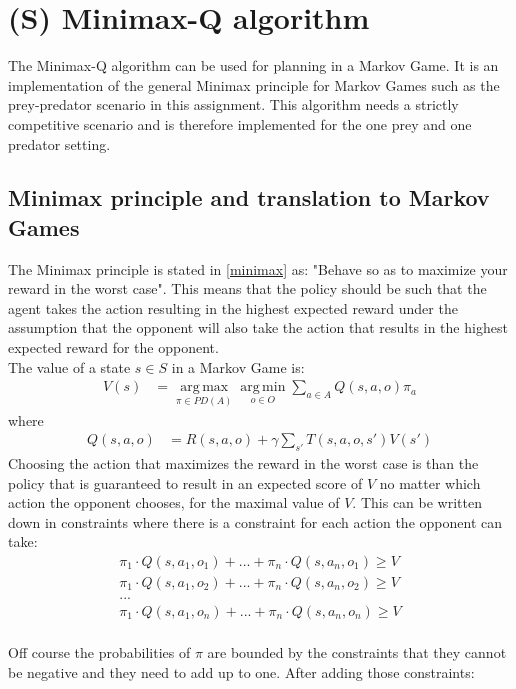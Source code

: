 
\section{(S) Minimax-Q algorithm}
The Minimax-Q algorithm can be used for planning in a Markov Game. It is an implementation of the general Minimax principle for Markov Games such as the prey-predator scenario in this assignment. This algorithm needs a strictly competitive scenario and is therefore implemented for the one prey and one predator setting. 

\subsection{Minimax principle and translation to Markov Games}
The Minimax principle is stated in \ref{minimax} as: "Behave so as to maximize your reward in the worst case". This means that the policy should be such that the agent takes the action resulting in the highest expected reward under the assumption that the opponent will also take the action that results in the highest expected reward for the opponent.  \\

 
The value of a state $s\in S$ in a Markov Game is:
\begin{align*}
V(s) &= \operatorname*{arg\,max}_{\pi \in PD(A)}
\operatorname*{arg\,min}_{o \in O}
\sum_{a \in A} Q(s,a,o) \pi_a
\end{align*}
where
\begin{align*}
Q(s,a,o) &= R(s,a,o) + \gamma \sum_{s'} T(s,a,o,s')V(s')
\end{align*}
Choosing the action that maximizes the reward in the worst case is than the policy that is guaranteed to result in an expected score of $V$ no matter which action the opponent chooses, for the maximal value of $V$. This can be written down in constraints where there is a constraint for each action the opponent can take:
%  
\begin{align*}
\pi_1 \cdot Q(s,a_1,o_1)+ ... + \pi_n \cdot Q(s,a_n,o_1) \geq V\\
\pi_1 \cdot Q(s,a_1,o_2)+ ... + \pi_n \cdot Q(s,a_n,o_2) \geq V\\
...\\
\pi_1 \cdot Q(s,a_1,o_n)+ ... + \pi_n \cdot Q(s,a_n,o_n) \geq V\\
\end{align*}

Off course the probabilities of $\pi$ are bounded by the constraints that they cannot be negative and they need to add up to one. After adding those constraints:

